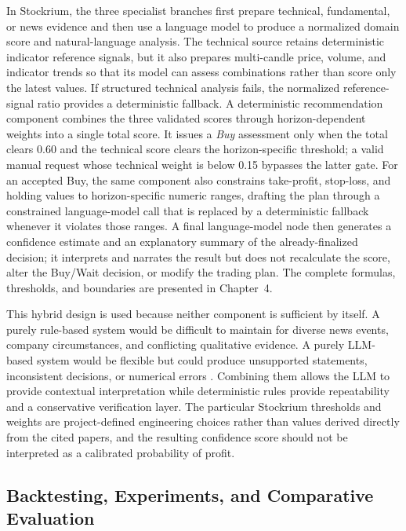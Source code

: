 In Stockrium, the three specialist branches first prepare technical, fundamental, or news evidence and then use a language model to produce a normalized domain score and natural-language analysis. The technical source retains deterministic indicator reference signals, but it also prepares multi-candle price, volume, and indicator trends so that its model can assess combinations rather than score only the latest values. If structured technical analysis fails, the normalized reference-signal ratio provides a deterministic fallback. A deterministic recommendation component combines the three validated scores through horizon-dependent weights into a single total score. It issues a \textit{Buy} assessment only when the total clears 0.60 and the technical score clears the horizon-specific threshold; a valid manual request whose technical weight is below 0.15 bypasses the latter gate. For an accepted Buy, the same component also constrains take-profit, stop-loss, and holding values to horizon-specific numeric ranges, drafting the plan through a constrained language-model call that is replaced by a deterministic fallback whenever it violates those ranges. A final language-model node then generates a confidence estimate and an explanatory summary of the already-finalized decision; it interprets and narrates the result but does not recalculate the score, alter the Buy/Wait decision, or modify the trading plan. The complete formulas, thresholds, and boundaries are presented in Chapter~4.

This hybrid design is used because neither component is sufficient by itself. A purely rule-based system would be difficult to maintain for diverse news events, company circumstances, and conflicting qualitative evidence. A purely LLM-based system would be flexible but could produce unsupported statements, inconsistent decisions, or numerical errors \cite{ji2023hallucination}. Combining them allows the LLM to provide contextual interpretation while deterministic rules provide repeatability and a conservative verification layer. The particular Stockrium thresholds and weights are project-defined engineering choices rather than values derived directly from the cited papers, and the resulting confidence score should not be interpreted as a calibrated probability of profit.

\subsection{Backtesting, Experiments, and Comparative Evaluation}

